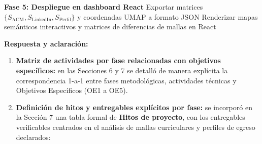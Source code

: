 \begin{algorithm}[H]
\begin{algorithmic}[1]
			\Statex
			\State \textbf{Fase 5: Despliegue en dashboard React}
			\State Exportar matrices $\{S_{\text{ACM}}, S_{\text{LinkedIn}}, S_{\text{Perfil}}\}$ y coordenadas UMAP a formato JSON
			\State Renderizar mapas semánticos interactivos y matrices de diferencias de mallas en React
		\EndProcedure
	\end{algorithmic}
\end{algorithm}

\newpage

\noindent
{}

\vspace{0.2cm}

\noindent
\textbf{Respuesta y aclaración:}
\begin{enumerate}[leftmargin=*]
	\item \textbf{Matriz de actividades por fase relacionadas con objetivos específicos:} en las Secciones 6 y 7 se detalló de manera explícita la correspondencia 1-a-1 entre fases metodológicas, actividades técnicas y Objetivos Específicos (OE1 a OE5).
	\item \textbf{Definición de hitos y entregables explícitos por fase:} se incorporó en la Sección 7 una tabla formal de \textbf{Hitos de proyecto}, con los entregables verificables centrados en el análisis de mallas curriculares y perfiles de egreso declarados:
\end{enumerate}

\vspace{0.3cm}

